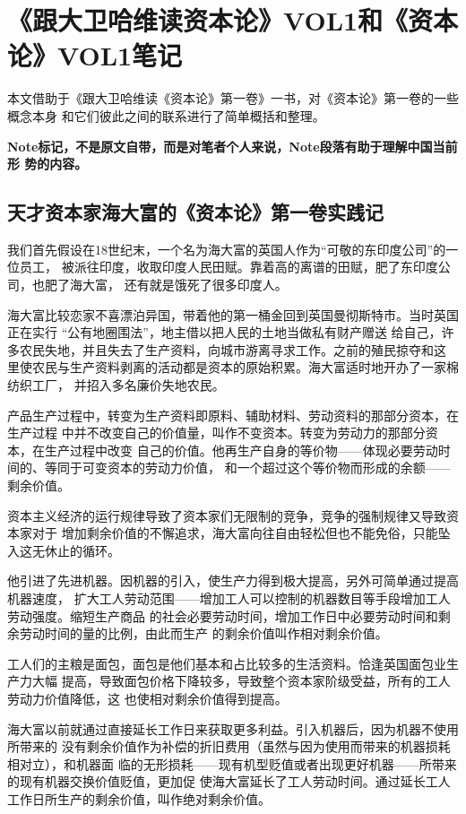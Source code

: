 \part{《跟大卫哈维读资本论》VOL1和《资本论》VOL1笔记}
\label{HarveyVol1}

本文借助于《跟大卫哈维读《资本论》第一卷》一书，对《资本论》第一卷的一些概念本身
和它们彼此之间的联系进行了简单概括和整理。

\textbf{Note标记，不是原文自带，而是对笔者个人来说，Note段落有助于理解中国当前形
势的内容。}

\chapter{天才资本家海大富的《资本论》第一卷实践记}
\label{cha:Capital}


我们首先假设在18世纪末，一个名为海大富的英国人作为“可敬的东印度公司”的一位员工，
被派往印度，收取印度人民田赋。靠着高的离谱的田赋，肥了东印度公司，也肥了海大富，
还有就是饿死了很多印度人。

海大富比较恋家不喜漂泊异国，带着他的第一桶金回到英国曼彻斯特市。当时英国正在实行
“公有地圈围法”，地主借以把人民的土地当做私有财产赠送
给自己，许多农民失地，并且失去了生产资料，向城市游离寻求工作。之前的殖民掠夺和这
里使农民与生产资料剥离的活动都是资本的原始积累。海大富适时地开办了一家棉纺织工厂，
并招入多名廉价失地农民。\bigskip


产品生产过程中，转变为生产资料即原料、辅助材料、劳动资料的那部分资本，在生产过程
中并不改变自己的价值量，叫作不变资本。转变为劳动力的那部分资本，在生产过程中改变
自己的价值。他再生产自身的等价物——体现必要劳动时间的、等同于可变资本的劳动力价值，
和一个超过这个等价物而形成的余额——剩余价值。 \bigskip


资本主义经济的运行规律导致了资本家们无限制的竞争，竞争的强制规律又导致资本家对于
增加剩余价值的不懈追求，海大富向往自由轻松但也不能免俗，只能坠入这无休止的循环。

他引进了先进机器。因机器的引入，使生产力得到极大提高，另外可简单通过提高机器速度，
扩大工人劳动范围——增加工人可以控制的机器数目等手段增加工人劳动强度。缩短生产商品
的社会必要劳动时间，增加工作日中必要劳动时间和剩余劳动时间的量的比例，由此而生产
的剩余价值叫作相对剩余价值。

工人们的主粮是面包，面包是他们基本和占比较多的生活资料。恰逢英国面包业生产力大幅
提高，导致面包价格下降较多，导致整个资本家阶级受益，所有的工人劳动力价值降低，这
也使相对剩余价值得到提高。 \bigskip


海大富以前就通过直接延长工作日来获取更多利益。引入机器后，因为机器不使用所带来的
没有剩余价值作为补偿的折旧费用（虽然与因为使用而带来的机器损耗相对立），和机器面
临的无形损耗——现有机型贬值或者出现更好机器——所带来的现有机器交换价值贬值，更加促
使海大富延长了工人劳动时间。通过延长工人工作日所生产的剩余价值，叫作绝对剩余价值。
\bigskip


